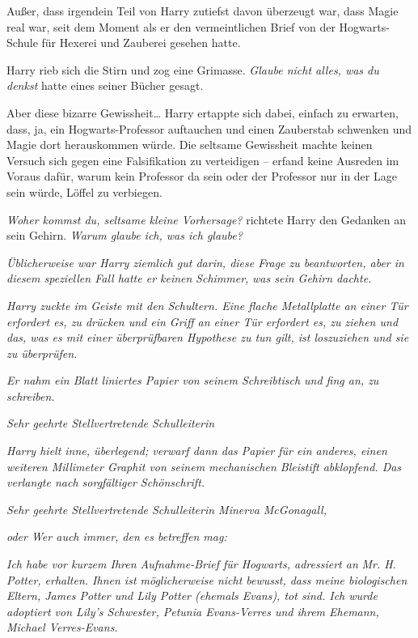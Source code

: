 {Außer, dass irgendein Teil von Harry zutiefst davon überzeugt war, dass Magie real war, seit dem Moment als er den vermeintlichen Brief von der Hogwarts-Schule für Hexerei und Zauberei gesehen hatte.

Harry rieb sich die Stirn und zog eine Grimasse. \emph{Glaube nicht alles, was du denkst} hatte eines seiner Bücher gesagt.

Aber diese bizarre Gewissheit… Harry ertappte sich dabei, einfach zu erwarten, dass, ja, ein Hogwarts-Professor auftauchen und einen Zauberstab schwenken und Magie dort herauskommen würde. Die seltsame Gewissheit machte keinen Versuch sich gegen eine Falsifikation zu verteidigen -- erfand keine Ausreden im Voraus dafür, warum kein Professor da sein oder der Professor nur in der Lage sein würde, Löffel zu verbiegen.

\emph{Woher kommst du, seltsame kleine Vorhersage?} richtete Harry den Gedanken an sein Gehirn. \emph{Warum glaube ich, was ich glaube?}

\emph{Üblicherweise war Harry ziemlich gut darin, diese Frage zu beantworten, aber in diesem speziellen Fall hatte er keinen} \emph{\emph{Schimmer,}} \emph{was sein Gehirn dachte.}

\emph{Harry zuckte im Geiste mit den Schultern. Eine flache Metallplatte an einer Tür erfordert es, zu drücken und ein Griff an einer Tür erfordert es, zu ziehen und das, was es mit einer überprüfbaren Hypothese zu tun gilt, ist loszuziehen und sie zu überprüfen.}

\emph{Er nahm ein Blatt liniertes Papier von seinem Schreibtisch und fing an, zu schreiben.}

\emph{\emph{Sehr geehrte Stellvertretende Schulleiterin}}

\emph{Harry hielt inne, überlegend; verwarf dann das Papier für ein anderes, einen weiteren Millimeter Graphit von seinem mechanischen Bleistift abklopfend. Das verlangte nach sorgfältiger Schönschrift.}

\emph{\emph{Sehr geehrte Stellvertretende Schulleiterin Minerva McGonagall,}}

\emph{oder Wer auch immer, den es betreffen mag:}

\emph{Ich habe vor kurzem Ihren Aufnahme-Brief für Hogwarts, adressiert an} \emph{Mr. H. Potter, erhalten. Ihnen ist möglicherweise nicht bewusst, dass meine biologischen Eltern, James Potter und Lily Potter (ehemals Evans), tot sind. Ich wurde adoptiert von Lily's Schwester, Petunia Evans-Verres und ihrem Ehemann, Michael Verres-Evans.}

}
